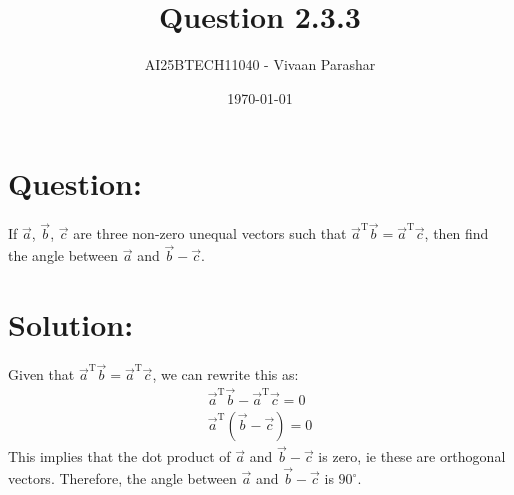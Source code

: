 \documentclass[a4paper, 12pt]{article}
\title{Question 2.3.3}
\author{AI25BTECH11040 - Vivaan Parashar}
\date{\today}
\begin{document}
\maketitle

\section{Question: }
If $\vec{a}$, $\vec{b}$, $\vec{c}$ are three non-zero unequal vectors such that $\vec{a}^{\mathrm{T}}\vec{b} = \vec{a}^{\mathrm{T}}\vec{c}$, then find the angle between $\vec{a}$ and $\vec{b}-\vec{c}$.

\section{Solution: }
Given that $\vec{a}^{\mathrm{T}}\vec{b} = \vec{a}^{\mathrm{T}}\vec{c}$, we can rewrite this as:
\begin{align}
    \vec{a}^{\mathrm{T}}\vec{b} - \vec{a}^{\mathrm{T}}\vec{c} = 0 \\
    \vec{a}^{\mathrm{T}}(\vec{b} - \vec{c}) = 0
\end{align}
This implies that the dot product of $\vec{a}$ and $\vec{b} - \vec{c}$ is zero, ie these are orthogonal vectors.
Therefore, the angle between $\vec{a}$ and $\vec{b} - \vec{c}$ is $90^\circ$.
\end{document}
